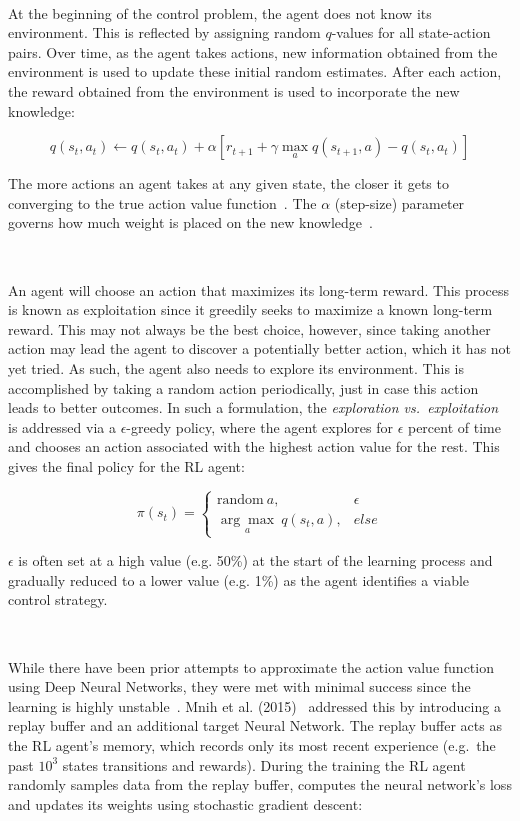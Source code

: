 \

At the beginning of the control problem, the agent does not know its environment.
This is reflected by assigning random $q$-values for all state-action pairs.
Over time, as the agent takes actions, new information obtained from the environment is used to update these initial random estimates.
After each action, the reward obtained from the environment is used to incorporate the new knowledge:

\begin{equation}
    q(s_t,a_t ) \leftarrow q(s_t,a_t ) + \alpha \left[ r_{t+1}+\gamma  \max_a q(s_{t+1},a) - q(s_t,a_t ) \right]
\end{equation}

The more actions an agent takes at any given state, the closer it gets to converging to the true action value function~\cite{Sutton98}.
The $\alpha$ (step-size) parameter governs how much weight is placed on the new knowledge~\cite{Sutton98}.

\

An agent will choose an action that maximizes its long-term reward.
This process is known as exploitation since it greedily seeks to maximize a known long-term reward.
This may not always be the best choice, however, since taking another action may lead the agent to discover a potentially better action, which it has not yet tried.
As such, the agent also needs to explore its environment.
This is accomplished by taking a random action periodically, just in case this action leads to better outcomes.
In such a formulation, the \textit{exploration vs.\ exploitation} is addressed via a $\epsilon$-greedy policy, where the agent explores for $\epsilon$ percent of time and chooses an action associated with the highest action value for the rest.
This gives the final policy for the RL agent:

\begin{equation}
    \pi(s_t) = \begin{cases}
    \text{random} \  a, & \epsilon  \\
    \underset{a}{\arg\max} \ q(s_t,a), & else
    \end{cases}
\end{equation}

$\epsilon$ is often set at a high value (e.g. 50\%) at the start of the learning process and gradually reduced to a lower value (e.g. 1\%) as the agent identifies a viable control strategy.

\

While there have been prior attempts to approximate the action value function using Deep Neural Networks, they were met with minimal success since the learning is highly unstable~\cite{Mnih2015}.
Mnih et al. (2015)~\cite{Mnih2015} addressed this by introducing a replay buffer and an additional target Neural Network.
The replay buffer acts as the RL agent’s memory, which records only its most recent experience (e.g.\ the past $10^3$ states transitions and rewards).
During the training the RL agent randomly samples data from the replay buffer, computes the neural network’s loss and updates its weights using stochastic gradient descent:


